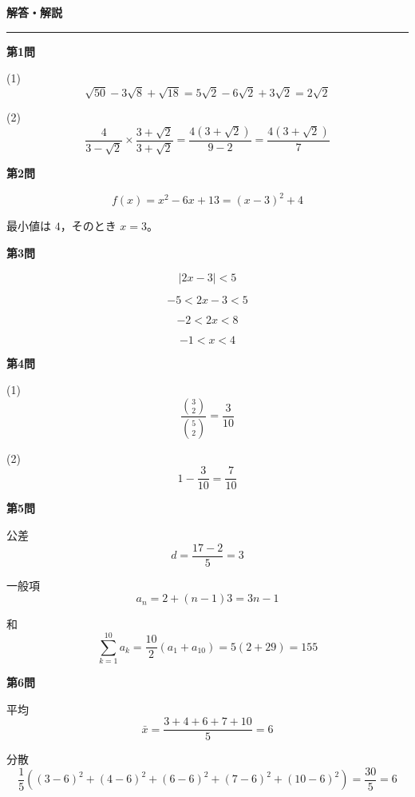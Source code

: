 \documentclass[lualatex,ja=standard]{bxjsarticle}
\begin{document}
\textbf{解答・解説}
\hrule
\vspace{1em}

\textbf{第1問}

(1)
\[
\sqrt{50}-3\sqrt{8}+\sqrt{18}
=5\sqrt{2}-6\sqrt{2}+3\sqrt{2}
=2\sqrt{2}
\]

(2)
\[
\frac{4}{3-\sqrt{2}}
\times
\frac{3+\sqrt{2}}{3+\sqrt{2}}
=
\frac{4(3+\sqrt{2})}{9-2}
=
\frac{4(3+\sqrt{2})}{7}
\]

\vspace{1em}
\textbf{第2問}

\[
f(x)=x^2-6x+13
=(x-3)^2+4
\]

最小値は $4$，そのとき $x=3$。

\vspace{1em}
\textbf{第3問}

\[
|2x-3|<5
\]

\[
-5<2x-3<5
\]

\[
-2<2x<8
\]

\[
-1<x<4
\]

\vspace{1em}
\textbf{第4問}

(1)
\[
\frac{\binom{3}{2}}{\binom{5}{2}}
=
\frac{3}{10}
\]

(2)
\[
1-\frac{3}{10}
=
\frac{7}{10}
\]

\vspace{1em}
\textbf{第5問}

公差
\[
d=\frac{17-2}{5}=3
\]

一般項
\[
a_n=2+(n-1)3=3n-1
\]

和
\[
\sum_{k=1}^{10} a_k
=
\frac{10}{2}(a_1+a_{10})
=
5(2+29)
=
155
\]

\vspace{1em}
\textbf{第6問}

平均
\[
\bar{x}=\frac{3+4+6+7+10}{5}=6
\]

分散
\[
\frac{1}{5}
\left(
(3-6)^2+(4-6)^2+(6-6)^2+(7-6)^2+(10-6)^2
\right)
=
\frac{30}{5}
=
6
\]
\end{document}
